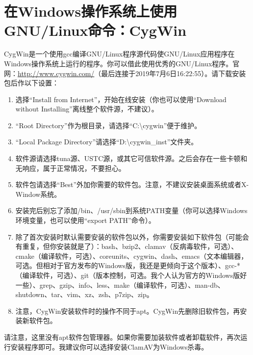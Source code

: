 \section{在Windows操作系统上使用GNU/Linux命令：CygWin}
CygWin是一个使用gcc编译GNU/Linux程序源代码使GNU/Linux应用程序在Windows操作系统上运行的程序。你可以借此使用优秀的GNU/Linux程序。官网：\url{http://www.cygwin.com/}（最后连接于2019年7月6日16:22:55）。请下载安装包后作以下设置：
\begin{enumerate}
\item 选择“Install from Internet”，开始在线安装（你也可以使用“Download without Installing”离线整个软件源，不建议）。
\item “Root Directory”作为根目录，请选择“C:\textbackslash cygwin”便于维护。
\item “Local Package Directory”请选择“D:\textbackslash cygwin\_inst”文件夹。
\item 软件源请选择tuna源、USTC源，或其它可信软件源。之后会存在一些卡顿和无响应，属于正常情况，不要担心。
\item 软件包请选择“Best”外加你需要的软件包。注意，不建议安装桌面系统或者X-Window系统。
\item 安装完后别忘了添加/bin、/usr/sbin到系统PATH变量（你可以选择Windows环境变量，也可以使用“export PATH”命令）。 
\item 除了首次安装时默认需要安装的软件包以外，你需要安装如下软件包（可能会有重复，但你安装就是了）：bash、bzip2、clamav（反病毒软件，可选）、cmake（编译软件，可选）、coreunits、cygwin、dash、emacs（文本编辑器，可选。但相对于官方发布的Windows版，我还是更倾向于这个版本）、gcc-*（编译软件，可选）、git（版本控制，可选。我个人认为官方的Windows版好一些）、grep、gzip、info、less、make（编译软件，可选）、man-db、shutdown、tar、vim、xz、zsh、p7zip、zip。
\item 注意，CygWin安装软件时的操作不同于apt。CygWin先删除旧软件包，再安装新软件包。
\end{enumerate}\par
请注意，这里没有apt软件包管理器。如果你需要加装软件或者卸载软件，再次运行安装程序即可。我建议你可以选择安装ClamAV为Windows杀毒。
